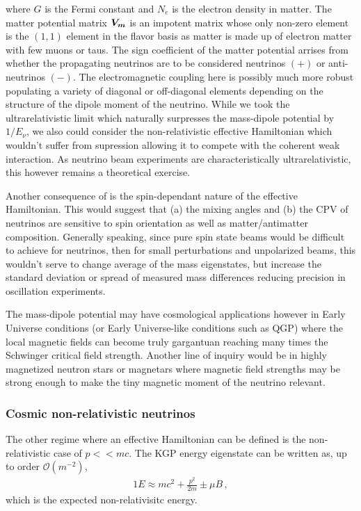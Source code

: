 where $G$ is the Fermi constant and $N_{e}$ is the electron density in matter. The matter potential matrix $\boldsymbol{V_{m}}$ is an impotent matrix whose only non-zero element is the $(1,1)$ element in the flavor basis as matter is made up of electron matter with few muons or taus. \ar The sign coefficient of the matter potential arrises from whether the propagating neutrinos are to be considered neutrinos $(+)$ or anti-neutrinos $(-)$. \ar The electromagnetic coupling here is possibly much more robust populating a variety of diagonal or off-diagonal elements depending on the structure of the dipole moment of the neutrino. While we took the ultrarelativistic limit which naturally surpresses the mass-dipole potential by $1/E_{\nu}$, we also could consider the non-relativistic effective Hamiltonian which wouldn't suffer from supression allowing it to compete with the coherent weak interaction. As neutrino beam experiments are characteristically ultrarelativistic, this however remains a theoretical exercise. 

Another consequence of  is the spin-dependant nature of the effective Hamiltonian. This would suggest that (a) the mixing angles and (b) the CPV of neutrinos are sensitive to spin orientation as well as matter/antimatter composition. Generally speaking, since pure spin state beams would be difficult to achieve for neutrinos, then for small perturbations and unpolarized beams, this wouldn't serve to change average of the mass eigenstates, but increase the standard deviation or spread of measured mass differences reducing precision in oscillation experiments.

The mass-dipole potential may have cosmological applications however in Early Universe conditions (or Early Universe-like conditions such as QGP) where the local magnetic fields can become truly gargantuan reaching many times the Schwinger critical field strength. \ar Another line of inquiry would be in highly magnetized neutron stars or magnetars \ar where magnetic field strengths may be strong enough to make the tiny magnetic moment of the neutrino relevant.

\subsubsection{Cosmic non-relativistic neutrinos}
\noindent The other regime where an effective Hamiltonian can be defined is the non-relativistic case of $p<<mc$. The KGP energy eigenstate  can be written as, up to order $\mathcal{O}(m^{-2})$,
\begin{alignat}{1}
	\label{nonrel:1} E\approx mc^{2}+\frac{p^{2}}{2m}\pm\mu B\,,
\end{alignat}
which is the expected non-relativisitc energy.

